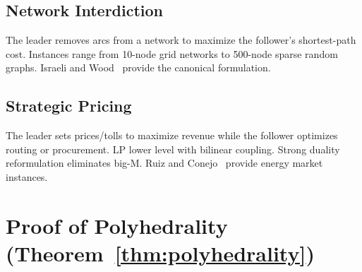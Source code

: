 \documentclass[11pt]{article}
\begin{document}
\subsection{Network Interdiction}
The leader removes arcs from a network to maximize the follower's
shortest-path cost. Instances range from 10-node grid networks to
500-node sparse random graphs. Israeli and Wood~\cite{israeli2002shortest} provide the canonical
formulation.

\subsection{Strategic Pricing}
The leader sets prices/tolls to maximize revenue while the follower
optimizes routing or procurement. LP lower level with bilinear
coupling. Strong duality reformulation eliminates big-M. Ruiz and
Conejo~\cite{ruiz2009pool} provide energy market instances.

\appendix

\section{Proof of Polyhedrality (Theorem~\ref{thm:polyhedrality})}
\label{app:polyhedrality}
\end{document}
